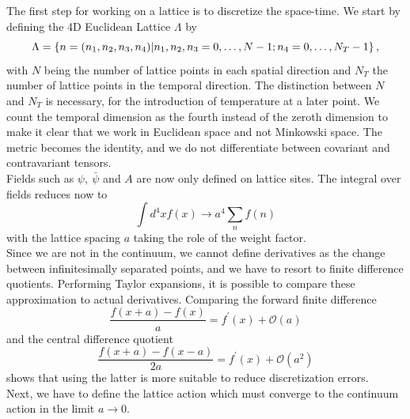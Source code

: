 The first step for working on a lattice is to discretize the space-time. We start by defining the 4D Euclidean Lattice $\Lambda$ by
\begin{equation}
    \Lambda = \left\{n=(n_1,n_2,n_3,n_4)\vert n_1,n_2,n_3=0,\dots,N-1;n_4=0,\dots,N_T-1\right\},
\end{equation}
with $N$ being the number of lattice points in each spatial direction and $N_T$ the number of lattice points in the temporal direction. The distinction between $N$ and $N_T$ is necessary, for the introduction of temperature at a later point. We count the temporal dimension as the fourth instead of the zeroth dimension to make it clear that we work in Euclidean space and not Minkowski space. The metric becomes the identity, and we do not differentiate between covariant and contravariant tensors.  \\
Fields such as $\psi,~\bar\psi$ and $A$ are now only defined on lattice sites. The integral over fields reduces now to 
\begin{equation}
    \int d^4x f(x)\rightarrow a^4\sum_nf(n)
\end{equation}
with the lattice spacing $a$ taking the role of the weight factor.\\
Since we are not in the continuum, we cannot define derivatives as the change between infinitesimally separated points, and we have to resort to finite difference quotients. Performing Taylor expansions, it is possible to compare these approximation to actual derivatives. Comparing the forward finite difference
\begin{equation}
    \frac{f(x+a)-f(x)}{a}=f^\prime(x)+\mathcal{O}(a)
\end{equation}
and the central difference quotient
\begin{equation}
    \frac{f(x+a)-f(x-a)}{2a}=f^\prime(x)+\mathcal{O}(a^2)
\end{equation}
shows that using the latter is more suitable to reduce discretization errors\cite{gattringer}.\\
Next, we have to define the lattice action which must converge to the continuum action in the limit $a\to 0$. 






